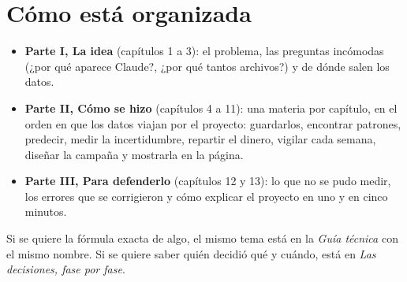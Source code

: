 \section*{Cómo está organizada}
\begin{itemize}
\item \textbf{Parte I, La idea} (capítulos 1 a 3): el problema, las preguntas incómodas (¿por qué aparece Claude?, ¿por qué
  tantos archivos?) y de dónde salen los datos.
\item \textbf{Parte II, Cómo se hizo} (capítulos 4 a 11): una materia por capítulo, en el orden en que los datos viajan por
  el proyecto: guardarlos, encontrar patrones, predecir, medir la incertidumbre, repartir el dinero, vigilar cada semana,
  diseñar la campaña y mostrarla en la página.
\item \textbf{Parte III, Para defenderlo} (capítulos 12 y 13): lo que no se pudo medir, los errores que se corrigieron y
  cómo explicar el proyecto en uno y en cinco minutos.
\end{itemize}

Si se quiere la fórmula exacta de algo, el mismo tema está en la \emph{Guía técnica} con el mismo nombre. Si se quiere
saber quién decidió qué y cuándo, está en \emph{Las decisiones, fase por fase}.
